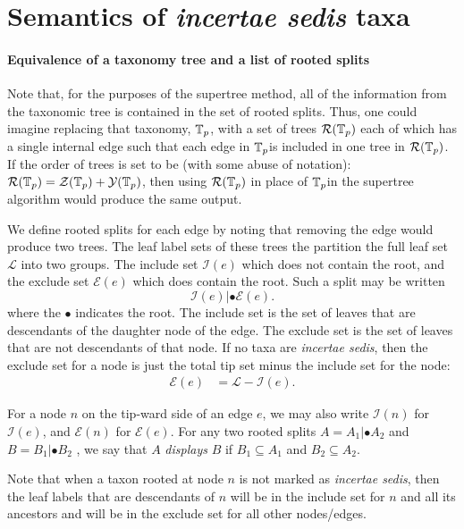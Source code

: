 \documentclass[english]{article}
\begin{document}
\section{\label{sec:Semantics-of-incertae}Semantics of \emph{incertae
sedis} taxa}

\paragraph{Equivalence of a taxonomy tree and a list of rooted splits}

Note that, for the purposes of the supertree method, all of the
information from the taxonomic tree is contained in the set of rooted
splits. Thus, one could imagine replacing that taxonomy,
$\mbox{\ensuremath{\mathbb{T}}}_{p}$, with a set of trees $\mathcal{R}(\mbox{\ensuremath{\mathbb{T}}}_{p})$ each
of which has a single internal edge such that each edge in
$\mbox{\ensuremath{\mathbb{T}}}_{p}$is included in one tree in
$\mathcal{R}(\mbox{\ensuremath{\mathbb{T}}}_{p})$. If the order of trees is set to be (with
some abuse of notation):
$\mathcal{R}(\mbox{\ensuremath{\mathbb{T}}}_{p})=\mathcal{Z}(\mbox{\ensuremath{\mathbb{T}}}_{p}) + 
\mathcal{Y}(\mbox{\ensuremath{\mathbb{T}}}_{p})$, then using $\mathcal{R}(\mbox{\ensuremath{\mathbb{T}}}_{p})$ in
place of $\mbox{\ensuremath{\mathbb{T}}}_{p}$in the supertree algorithm would produce the
same output.

We define rooted splits for each edge by noting that removing the edge
would produce two trees. The leaf label sets of these trees the
partition the full leaf set $\mathcal{L}$ into two groups. The include
set $\mathcal{I}(e)$ which does not contain the root, and the exclude
set $\mathcal{E}(e)$ which does contain the root. Such a split may be
written \[ \mathcal{I}(e)|\bullet\mathcal{E}(e). \] where the
$\bullet$ indicates the root. The include set is the set of leaves
that are descendants of the daughter node of the edge. The exclude set
is the set of leaves that are not descendants of that node. If no taxa
are \emph{incertae sedis}, then the exclude set for a node is just the
total tip set minus the include set for the node: \begin{align*}
\mathcal{E}(e) & =\mathcal{L}-\mathcal{I}(e). \end{align*}

For a node $n$ on the tip-ward side of an edge $e$, we may also write
$\mathcal{I}(n)$ for $\mathcal{I}(e)$, and $\mathcal{E}(n)$ for
$\mathcal{E}(e)$. For any two rooted splits $A=A_{1}|\bullet A_{2}$
and $B=B_{1}|\bullet B_{2}$ , we say that $A$ \emph{displays }$B$ if
$B_{1}\subseteq A_{1}$ and $B_{2}\subseteq A_{2}$.

Note that when a taxon rooted at node $n$ is not marked as
\emph{incertae sedis}, then the leaf labels that are descendants of
$n$ will be in the include set for $n$ and all its ancestors and will
be in the exclude set for all other nodes/edges.
\end{document}
